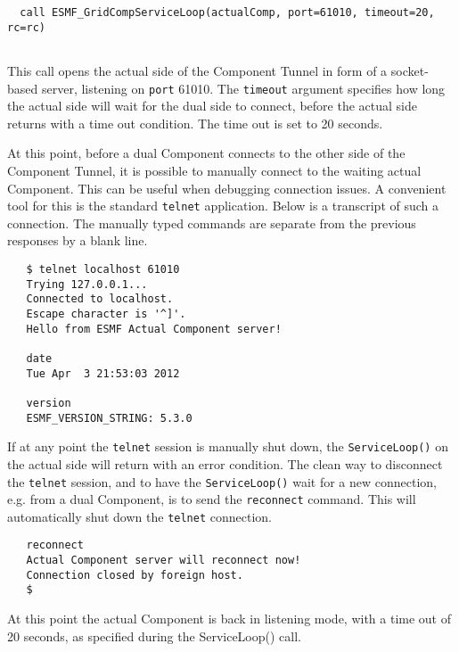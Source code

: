  \begin{verbatim}
  call ESMF_GridCompServiceLoop(actualComp, port=61010, timeout=20, rc=rc)
 
\end{verbatim}
 

   This call opens the actual side of the Component Tunnel in form of a
   socket-based server, listening on {\tt port} 61010. The {\tt timeout} argument
   specifies how long the actual side will wait for the dual side
   to connect, before the actual side returns with a time out condition. The
   time out is set to 20 seconds.
  
   At this point, before a dual Component connects to the other side of the 
   Component Tunnel, it is
   possible to manually connect to the waiting actual Component. This can be
   useful when debugging connection issues. A convenient tool for this is the 
   standard {\tt telnet} application. Below is a transcript of such a connection.
   The manually typed commands are separate from the previous responses by a 
   blank line.
  
   \begin{verbatim}
   $ telnet localhost 61010
   Trying 127.0.0.1...
   Connected to localhost.
   Escape character is '^]'.
   Hello from ESMF Actual Component server!
  
   date
   Tue Apr  3 21:53:03 2012
   
   version
   ESMF_VERSION_STRING: 5.3.0
   \end{verbatim}
  
   If at any point the {\tt telnet} session is manually shut down, the 
   {\tt ServiceLoop()} on the actual side will return with an error condition. 
   The clean way to
   disconnect the {\tt telnet} session, and to have the {\tt ServiceLoop()}
   wait for a new connection, e.g. from a dual Component, is to send the
   {\tt reconnect} command. This will automatically shut down the {\tt telnet}
   connection.
  
   \begin{verbatim}
   reconnect
   Actual Component server will reconnect now!
   Connection closed by foreign host.
   $
   \end{verbatim}
  
   At this point the actual Component is back in listening mode, with a time out
   of 20 seconds, as specified during the ServiceLoop() call.
  
